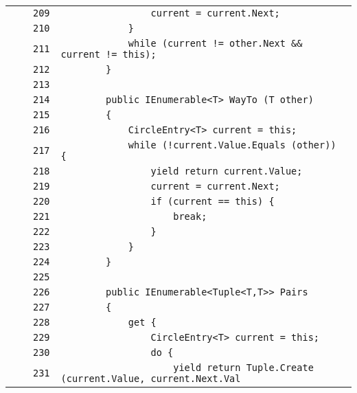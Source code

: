 \documentclass[a4paper,10pt]{article}
\begin{document}
\begin{longtable}[l]{lrrl}
\cellcolor{gray} &  & \verb~209~ & \verb~                current = current.Next;~\\
\cellcolor{gray} &  & \verb~210~ & \verb~            }~\\
\cellcolor{gray} &  & \verb~211~ & \verb~            while (current != other.Next && current != this);~\\
\cellcolor{gray} &  & \verb~212~ & \verb~        }~\\
\cellcolor{gray} &  & \verb~213~ & \verb~~\\
\cellcolor{gray} &  & \verb~214~ & \verb~        public IEnumerable<T> WayTo (T other)~\\
\cellcolor{gray} &  & \verb~215~ & \verb~        {~\\
\cellcolor{gray} &  & \verb~216~ & \verb~            CircleEntry<T> current = this;~\\
\cellcolor{gray} &  & \verb~217~ & \verb~            while (!current.Value.Equals (other)) {~\\
\cellcolor{gray} &  & \verb~218~ & \verb~                yield return current.Value;~\\
\cellcolor{gray} &  & \verb~219~ & \verb~                current = current.Next;~\\
\cellcolor{gray} &  & \verb~220~ & \verb~                if (current == this) {~\\
\cellcolor{gray} &  & \verb~221~ & \verb~                    break;~\\
\cellcolor{gray} &  & \verb~222~ & \verb~                }~\\
\cellcolor{gray} &  & \verb~223~ & \verb~            }~\\
\cellcolor{gray} &  & \verb~224~ & \verb~        }~\\
\cellcolor{gray} &  & \verb~225~ & \verb~~\\
\cellcolor{gray} &  & \verb~226~ & \verb~        public IEnumerable<Tuple<T,T>> Pairs~\\
\cellcolor{gray} &  & \verb~227~ & \verb~        {~\\
\cellcolor{gray} &  & \verb~228~ & \verb~            get {~\\
\cellcolor{gray} &  & \verb~229~ & \verb~                CircleEntry<T> current = this;~\\
\cellcolor{gray} &  & \verb~230~ & \verb~                do {~\\
\cellcolor{gray} &  & \verb~231~ & \verb~                    yield return Tuple.Create (current.Value, current.Next.Val~\\

\end{longtable}
\end{document}
